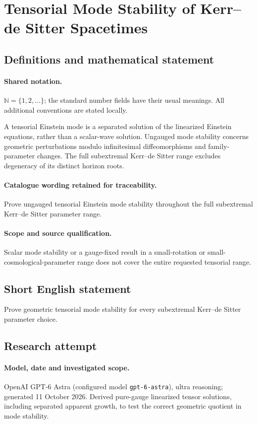\documentclass[11pt]{article}
\begin{document}
\section{Tensorial Mode Stability of Kerr–de Sitter Spacetimes}\label{statement}

\subsection{Definitions and mathematical statement}

\paragraph{Shared notation.}$\mathbb N=\{1,2,\ldots\}$; the standard number fields have their usual meanings. All additional conventions are stated locally.


A tensorial Einstein mode is a separated solution of the linearized Einstein equations, rather than a scalar-wave solution. Ungauged mode stability concerns geometric perturbations modulo infinitesimal diffeomorphisms and family-parameter changes. The full subextremal Kerr--de Sitter range excludes degeneracy of its distinct horizon roots.

\paragraph{Catalogue wording retained for traceability.}
Prove ungauged tensorial Einstein mode stability throughout the full subextremal Kerr–de Sitter parameter range.

\paragraph{Scope and source qualification.}Scalar mode stability or a gauge-fixed result in a small-rotation or small-cosmological-parameter range does not cover the entire requested tensorial range.
\subsection{Short English statement}
Prove geometric tensorial mode stability for every subextremal Kerr--de Sitter parameter choice.
\subsection{Research attempt}
\paragraph{Model, date and investigated scope.}
OpenAI GPT-6 Astra (configured model \texttt{gpt-6-astra}), ultra reasoning; generated 11 October 2026. Derived pure-gauge linearized tensor solutions, including separated apparent growth, to test the correct geometric quotient in mode stability.
\end{document}
